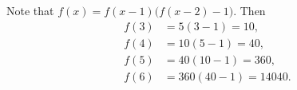 Note that $f(x)=f(x-1)\bigl(f(x-2)-1\bigr)$. Then
\begin{align*}
f(3)&=5(3-1)=10,\\
f(4)&=10(5-1)=40,\\
f(5)&=40(10-1)=360,\\
f(6)&=360(40-1)=\boxed{14040}.
\end{align*}
